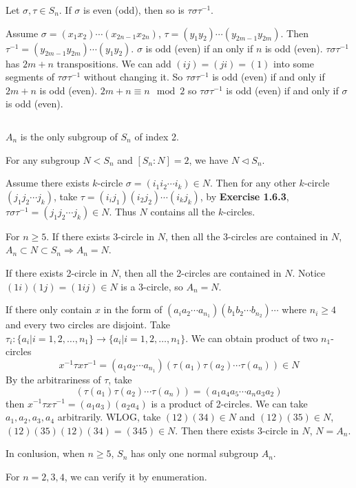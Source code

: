 $$ $$

\begin{ex}
    Let $\sigma, \tau \in S_{n}$. If $\sigma$ is even (odd), then so is $\tau\sigma\tau^{-1}$.
\end{ex}

\begin{answer}
    Assume $\sigma=(x_{1}x_{2})\cdots(x_{2n-1}x_{2n})$, $\tau=(y_{1}y_{2})\cdots(y_{2m-1}y_{2m})$. Then $\tau^{-1}=(y_{2m-1}y_{2m})\cdots(y_{1}y_{2})$. $\sigma$ is odd (even) if an only if $n$ is odd (even). $\tau\sigma\tau^{-1}$ has $2m+n$ transpositions. We can add $(ij)=(ji)=(1)$ into some segments of $\tau\sigma\tau^{-1}$ without changing it. So $\tau\sigma\tau^{-1}$ is odd (even) if and only if $2m+n$ is odd (even). $2m+n\equiv n\mod 2$ so $\tau\sigma\tau^{-1}$ is odd (even) if and only if $\sigma$ is odd (even).
\end{answer}

$$ $$

\begin{ex}
    $A_{n}$ is the only subgroup of $S_{n}$ of index 2.
\end{ex}

\begin{answer}
    For any subgroup $N<S_{n}$ and $\left[S_{n}:N\right]=2$, we have $N\lhd S_{n}$.

    Assume there exists $k$-circle $\sigma=(i_{1}i_{2}\cdots i_{k})\in N$. Then for any other $k$-circle $(j_{1}j_{2}\cdots j_{k})$, take $\tau=(i_{i}j_{1})(i_{2}j_{2})\cdots(i_{k}j_{k})$, by \textbf{Exercise 1.6.3}, $\tau\sigma\tau^{-1}=(j_{1}j_{2}\cdots j_{k})\in N$. Thus $N$ contains all the $k$-circles.

    For $n\geq 5$. If there exists 3-circle in $N$, then all the 3-circles are contained in $N$, $A_{n}\subset N\subset S_{n}\Rightarrow A_{n}=N$.

    If there exists 2-circle in $N$, then all the 2-circles are contained in $N$. Notice $(1i)(1j)=(1ij)\in N$ is a 3-circle, so $A_{n}=N$.

    If there only contain $x$ in the form of $(a_{i}a_{2}\cdots a_{n_{1}})(b_{1}b_{2}\cdots b_{n_{2}})\cdots$ where $n_{i}\geq 4$ and every two circles are disjoint. Take $\tau_{i}:\{a_{i}|i=1,2,\dots,n_{1}\}\to \{a_{i}|i=1,2,\dots,n_{1}\}$. We can obtain product of two $n_{1}$-circles\[x^{-1}\tau x \tau^{-1}=(a_{1}a_{2}\cdots a_{n_{1}})(\tau(a_{1})\tau(a_{2})\cdots \tau(a_{n}))\in N\] By the arbitrariness of $\tau$, take \[(\tau(a_{1})\tau(a_{2})\cdots \tau(a_{n}))=(a_{1}a_{4}a_{5}\cdots a_{n}a_{3}a_{2})\] then $x^{-1}\tau x \tau^{-1}=(a_{1}a_{3})(a_{2}a_{4})$ is a product of 2-circles. We can take $a_{1}, a_{2}, a_{3}, a_{4}$ arbitrarily. WLOG, take $(12)(34)\in N$ and $(12)(35)\in N$, $(12)(35)(12)(34)=(345)\in N$. Then there exists 3-circle in $N$, $N=A_{n}$.

    In conlusion, when $n\geq 5$, $S_{n}$ has only one normal subgroup $A_{n}$.

    For $n=2,3,4$, we can verify it by enumeration.
\end{answer}

